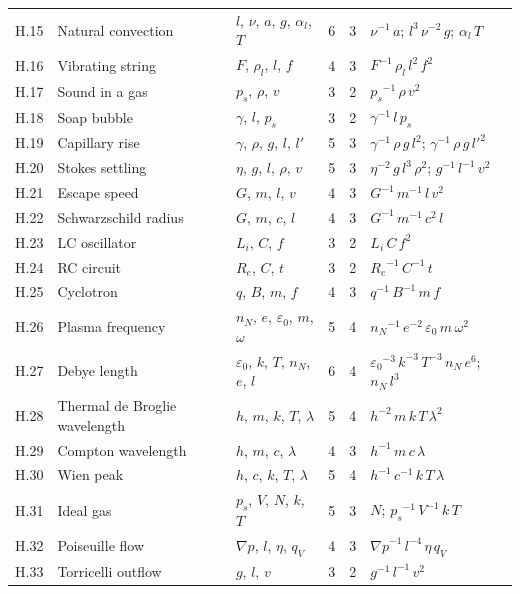 {\begin{longtable}{@{}l>{\raggedright\arraybackslash}p{3.0cm}>{\raggedright\arraybackslash}p{3.6cm}rr>{\raggedright\arraybackslash}p{6.2cm}@{}}
H.15 & Natural convection & $l$, $\nu$, $a$, $g$, $\alpha_l$, $T$ & 6 & 3 & ${\nu}^{-1}\,a$; ${l}^{3}\,{\nu}^{-2}\,g$; $\alpha_l\,T$ \\
H.16 & Vibrating string & $F$, $\rho_l$, $l$, $f$ & 4 & 3 & ${F}^{-1}\,\rho_l\,{l}^{2}\,{f}^{2}$ \\
H.17 & Sound in a gas & $p_s$, $\rho$, $v$ & 3 & 2 & ${p_s}^{-1}\,\rho\,{v}^{2}$ \\
H.18 & Soap bubble & $\gamma$, $l$, $p_s$ & 3 & 2 & ${\gamma}^{-1}\,l\,p_s$ \\
H.19 & Capillary rise & $\gamma$, $\rho$, $g$, $l$, $l'$ & 5 & 3 & ${\gamma}^{-1}\,\rho\,g\,{l}^{2}$; ${\gamma}^{-1}\,\rho\,g\,{l'}^{2}$ \\
H.20 & Stokes settling & $\eta$, $g$, $l$, $\rho$, $v$ & 5 & 3 & ${\eta}^{-2}\,g\,{l}^{3}\,{\rho}^{2}$; ${g}^{-1}\,{l}^{-1}\,{v}^{2}$ \\
H.21 & Escape speed & $G$, $m$, $l$, $v$ & 4 & 3 & ${G}^{-1}\,{m}^{-1}\,l\,{v}^{2}$ \\
H.22 & Schwarzschild radius & $G$, $m$, $c$, $l$ & 4 & 3 & ${G}^{-1}\,{m}^{-1}\,{c}^{2}\,l$ \\
H.23 & LC oscillator & $L_i$, $C$, $f$ & 3 & 2 & $L_i\,C\,{f}^{2}$ \\
H.24 & RC circuit & $R_e$, $C$, $t$ & 3 & 2 & ${R_e}^{-1}\,{C}^{-1}\,t$ \\
H.25 & Cyclotron & $q$, $B$, $m$, $f$ & 4 & 3 & ${q}^{-1}\,{B}^{-1}\,m\,f$ \\
H.26 & Plasma frequency & $n_N$, $e$, $\varepsilon_0$, $m$, $\omega$ & 5 & 4 & ${n_N}^{-1}\,{e}^{-2}\,\varepsilon_0\,m\,{\omega}^{2}$ \\
H.27 & Debye length & $\varepsilon_0$, $k$, $T$, $n_N$, $e$, $l$ & 6 & 4 & ${\varepsilon_0}^{-3}\,{k}^{-3}\,{T}^{-3}\,n_N\,{e}^{6}$; $n_N\,{l}^{3}$ \\
H.28 & Thermal de Broglie wavelength & $h$, $m$, $k$, $T$, $\lambda$ & 5 & 4 & ${h}^{-2}\,m\,k\,T\,{\lambda}^{2}$ \\
H.29 & Compton wavelength & $h$, $m$, $c$, $\lambda$ & 4 & 3 & ${h}^{-1}\,m\,c\,\lambda$ \\
H.30 & Wien peak & $h$, $c$, $k$, $T$, $\lambda$ & 5 & 4 & ${h}^{-1}\,{c}^{-1}\,k\,T\,\lambda$ \\
H.31 & Ideal gas & $p_s$, $V$, $N$, $k$, $T$ & 5 & 3 & $N$; ${p_s}^{-1}\,{V}^{-1}\,k\,T$ \\
H.32 & Poiseuille flow & $\nabla p$, $l$, $\eta$, $q_V$ & 4 & 3 & ${\nabla p}^{-1}\,{l}^{-4}\,\eta\,q_V$ \\
H.33 & Torricelli outflow & $g$, $l$, $v$ & 3 & 2 & ${g}^{-1}\,{l}^{-1}\,{v}^{2}$ \\

\end{longtable}}
